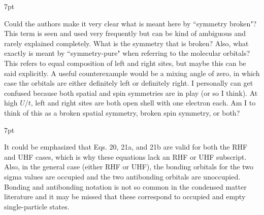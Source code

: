 \documentclass[10pt]{letter}
\newenvironment{formal}{%
  \def\FrameCommand{%
    \hspace{1pt}%
    {\color{darkblue}\vrule width 2pt}%
    {\color{formalshade}\vrule width 4pt}%
    \colorbox{formalshade}%
  }%
  \MakeFramed{\advance\hsize-\width\FrameRestore}%
  \noindent\hspace{-4.55pt}%
  \begin{adjustwidth}{}{7pt}%
  \vspace{2pt}\vspace{2pt}%
}
{%
  \vspace{2pt}\end{adjustwidth}\endMakeFramed%
}
\begin{document}
\begin{letter}

\begin{formal}
Could the authors make it very clear what is meant here by ``symmetry broken"? 
This term is seen and used very frequently but can be kind of ambiguous and rarely explained completely. 
What is the symmetry that is broken? 
Also, what exactly is meant by ``symmetry-pure" when referring to the molecular orbitals? This refers to equal composition of left and right sites, but maybe this can be said explicitly. 
A useful counterexample would be a mixing angle of zero, in which case the orbitals are either definitely left or definitely right.
I personally can get confused because both spatial and spin symmetries are in play (or so I think). 
At high $U/t$, left and right sites are both open shell with one electron each. 
Am I to think of this as a broken spatial symmetry, broken spin symmetry, or both?
\end{formal}


\begin{formal}
It could be emphasized that Eqs. 20, 21a, and 21b are valid for both the RHF and UHF cases, which is why these equations lack an RHF or UHF subscript. 
Also, in the general case (either RHF or UHF), the bonding orbitals for the two sigma values are occupied and the two antibonding orbitals are unoccupied. 
Bonding and antibonding notation is not so common in the condensed matter literature and it may be missed that these correspond to occupied and empty single-particle states.
\end{formal}


\end{letter}
\end{document}
